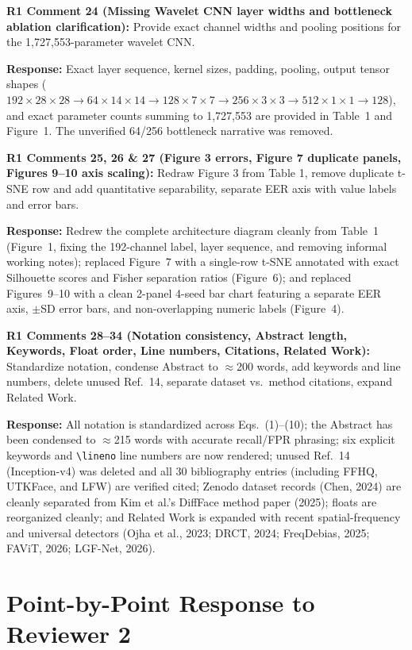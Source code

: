 \documentclass[11pt,a4paper]{article}
\newcommand{\reviewercomment}[2]{%
  \vspace{0.6em}\noindent\begin{tcolorbox}[colback=boxbg,colframe=revcolor,boxrule=0.6pt,left=6pt,right=6pt,top=4pt,bottom=4pt]
  \textbf{\color{revcolor}#1:} #2
  \end{tcolorbox}
}
\newcommand{\authorresponse}[1]{%
  \noindent\textbf{\color{respcolor}Response:} #1\par\vspace{0.5em}
}
\begin{document}
\reviewercomment{R1 Comment 24 (Missing Wavelet CNN layer widths and bottleneck ablation clarification)}{Provide exact channel widths and pooling positions for the 1,727,553-parameter wavelet CNN.}
\authorresponse{Exact layer sequence, kernel sizes, padding, pooling, output tensor shapes ($192\times 28\times 28 \to 64\times 14\times 14 \to 128\times 7\times 7 \to 256\times 3\times 3 \to 512\times 1\times 1 \to 128$), and exact parameter counts summing to 1,727,553 are provided in Table~1 and Figure~1. The unverified 64/256 bottleneck narrative was removed.}

\reviewercomment{R1 Comments 25, 26 \& 27 (Figure 3 errors, Figure 7 duplicate panels, Figures 9--10 axis scaling)}{Redraw Figure 3 from Table 1, remove duplicate t-SNE row and add quantitative separability, separate EER axis with value labels and error bars.}
\authorresponse{Redrew the complete architecture diagram cleanly from Table~1 (Figure~1, fixing the 192-channel label, layer sequence, and removing informal working notes); replaced Figure~7 with a single-row t-SNE annotated with exact Silhouette scores and Fisher separation ratios (Figure~6); and replaced Figures~9--10 with a clean 2-panel 4-seed bar chart featuring a separate EER axis, $\pm$SD error bars, and non-overlapping numeric labels (Figure~4).}

\reviewercomment{R1 Comments 28--34 (Notation consistency, Abstract length, Keywords, Float order, Line numbers, Citations, Related Work)}{Standardize notation, condense Abstract to $\approx$200 words, add keywords and line numbers, delete unused Ref.\ 14, separate dataset vs.\ method citations, expand Related Work.}
\authorresponse{All notation is standardized across Eqs.\ (1)--(10); the Abstract has been condensed to $\approx$215 words with accurate recall/FPR phrasing; six explicit keywords and \texttt{\textbackslash lineno} line numbers are now rendered; unused Ref.\ 14 (Inception-v4) was deleted and all 30 bibliography entries (including FFHQ, UTKFace, and LFW) are verified cited; Zenodo dataset records (Chen, 2024) are cleanly separated from Kim et al.'s DiffFace method paper (2025); floats are reorganized cleanly; and Related Work is expanded with recent spatial-frequency and universal detectors (Ojha et al., 2023; DRCT, 2024; FreqDebias, 2025; FAViT, 2026; LGF-Net, 2026).}

\section*{Point-by-Point Response to Reviewer 2}
\end{document}
